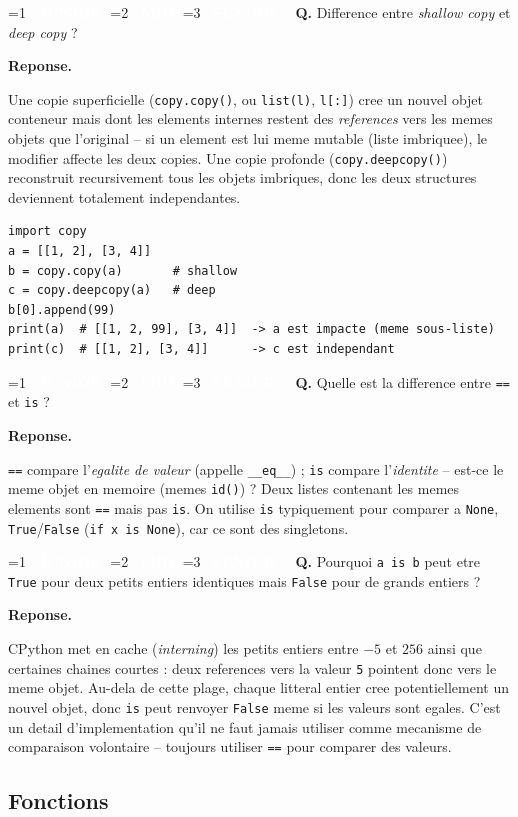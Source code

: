 \documentclass[11pt,a4paper]{article}
\newcommand{\badgeJ}{\textcolor{white}{\colorbox{junior}{\small\bfseries\ JUNIOR\ }}}
\newcommand{\badgeM}{\textcolor{white}{\colorbox{mid}{\small\bfseries\ MID\ }}}
\newcommand{\badgeS}{\textcolor{white}{\colorbox{senior}{\small\bfseries\ SENIOR\ }}}
\newcounter{qcount}
\newenvironment{qa}[2]{%
  \stepcounter{qcount}%
  \par\vspace{6pt}%
  \noindent\colorbox{qbg}{\parbox{\dimexpr\linewidth-12pt}{\vspace{2pt}%
  \ifnum#1=1 \badgeJ\fi\ifnum#1=2 \badgeM\fi\ifnum#1=3 \badgeS\fi
  \ \textbf{Q\theqcount.} #2\vspace{2pt}}}\par\vspace{4pt}%
  \noindent\textbf{\color{accent}Reponse.}\ \ignorespaces
}{%
  \par\vspace{8pt}%
}
\begin{document}
\begin{qa}{2}{Difference entre \emph{shallow copy} et \emph{deep copy} ?}
Une copie superficielle (\texttt{copy.copy()}, ou \texttt{list(l)}, \texttt{l[:]})
cree un nouvel objet conteneur mais dont les elements internes restent des
\emph{references} vers les memes objets que l'original -- si un element est lui
meme mutable (liste imbriquee), le modifier affecte les deux copies. Une copie
profonde (\texttt{copy.deepcopy()}) reconstruit recursivement tous les objets
imbriques, donc les deux structures deviennent totalement independantes.
\begin{lstlisting}
import copy
a = [[1, 2], [3, 4]]
b = copy.copy(a)       # shallow
c = copy.deepcopy(a)   # deep
b[0].append(99)
print(a)  # [[1, 2, 99], [3, 4]]  -> a est impacte (meme sous-liste)
print(c)  # [[1, 2], [3, 4]]      -> c est independant
\end{lstlisting}
\end{qa}

\begin{qa}{1}{Quelle est la difference entre \texttt{==} et \texttt{is} ?}
\texttt{==} compare l'\emph{egalite de valeur} (appelle \texttt{\_\_eq\_\_}) ;
\texttt{is} compare l'\emph{identite} -- est-ce le meme objet en memoire
(memes \texttt{id()}) ? Deux listes contenant les memes elements sont
\texttt{==} mais pas \texttt{is}. On utilise \texttt{is} typiquement pour
comparer a \texttt{None}, \texttt{True}/\texttt{False} (\texttt{if x is None}),
car ce sont des singletons.
\end{qa}

\begin{qa}{2}{Pourquoi \texttt{a is b} peut etre \texttt{True} pour deux petits entiers identiques mais \texttt{False} pour de grands entiers ?}
CPython met en cache (\emph{interning}) les petits entiers entre $-5$ et $256$
ainsi que certaines chaines courtes : deux references vers la valeur \texttt{5}
pointent donc vers le meme objet. Au-dela de cette plage, chaque litteral entier
cree potentiellement un nouvel objet, donc \texttt{is} peut renvoyer
\texttt{False} meme si les valeurs sont egales. C'est un detail d'implementation
qu'il ne faut jamais utiliser comme mecanisme de comparaison volontaire --
toujours utiliser \texttt{==} pour comparer des valeurs.
\end{qa}

\subsection{Fonctions}
\end{document}
